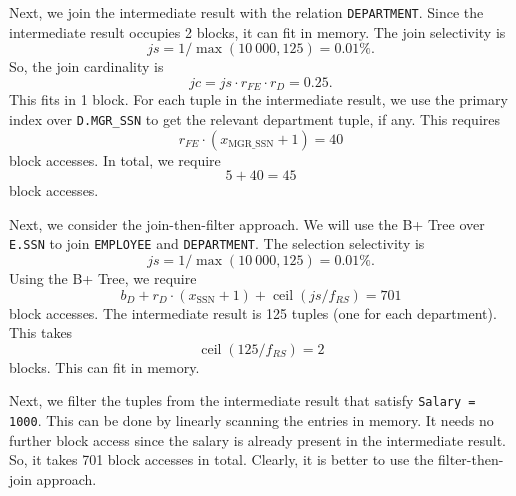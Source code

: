 \documentclass[a4paper, openany]{memoir}
\theoremstyle{definition}
\theoremstyle{plain}
\begin{document}
Next, we join the intermediate result with the relation \texttt{DEPARTMENT}. Since the intermediate result occupies 2 blocks, it can fit in memory. The join selectivity is
\[\textit{js} = 1/\max(10 \ 000, 125) = 0.01\%.\]
So, the join cardinality is
\[\textit{jc} = \textit{js} \cdot r_{FE} \cdot r_D = 0.25.\]
This fits in 1 block. For each tuple in the intermediate result, we use the primary index over \texttt{D.MGR\_SSN} to get the relevant department tuple, if any. This requires
\[r_{FE} \cdot (x_{\text{MGR\_SSN}} + 1) = 40\]
block accesses. In total, we require
\[5 + 40 = 45\]
block accesses.

Next, we consider the join-then-filter approach. We will use the B+ Tree over \texttt{E.SSN} to join \texttt{EMPLOYEE} and \texttt{DEPARTMENT}. The selection selectivity is
\[\textit{js} = 1/\max(10 \ 000, 125) = 0.01\%.\]
Using the B+ Tree, we require
\[b_D + r_D \cdot (x_{\text{SSN}} + 1) + \operatorname{ceil}(\textit{js}/f_{RS}) = 701\]
block accesses. The intermediate result is 125 tuples (one for each department). This takes
\[\operatorname{ceil}(125/f_{RS}) = 2\]
blocks. This can fit in memory.

Next, we filter the tuples from the intermediate result that satisfy \texttt{Salary = 1000}. This can be done by linearly scanning the entries in memory. It needs no further block access since the salary is already present in the intermediate result. So, it takes 701 block accesses in total. Clearly, it is better to use the filter-then-join approach.
\end{document}
